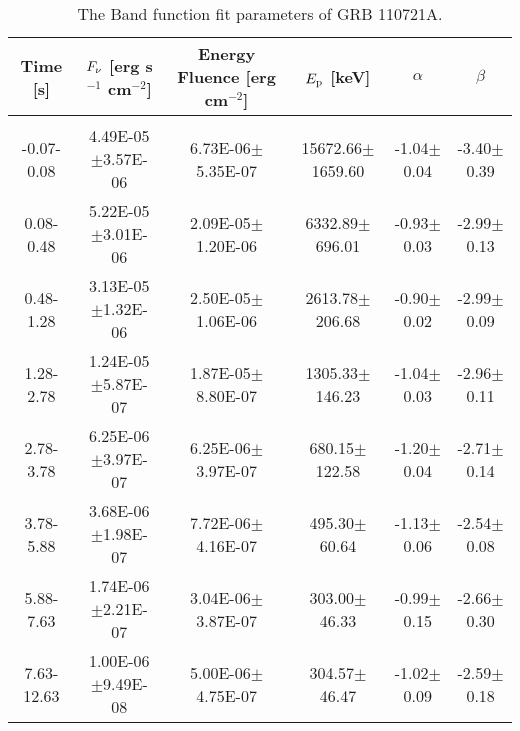 \begin{table}[h]
\centering
\scriptsize
\label{tab:}
\begin{tabular}{c| c c c c c}
Time [s] & $F_{\nu}$ [erg s$^{-1}$ cm$^{-2}$] & Energy Fluence [erg cm$^{-2}$] & $E_{\rm p}$ [keV] & $\alpha$ & $\beta$ \\
\hline \hline\\ 

-0.07-0.08 & 4.49E-05$\pm$3.57E-06 & 6.73E-06$\pm$5.35E-07 & 15672.66$\pm$1659.60 & -1.04$\pm$0.04 & -3.40$\pm$0.39 \\ 

0.08-0.48 & 5.22E-05$\pm$3.01E-06 & 2.09E-05$\pm$1.20E-06 & 6332.89$\pm$696.01 & -0.93$\pm$0.03 & -2.99$\pm$0.13 \\ 

0.48-1.28 & 3.13E-05$\pm$1.32E-06 & 2.50E-05$\pm$1.06E-06 & 2613.78$\pm$206.68 & -0.90$\pm$0.02 & -2.99$\pm$0.09 \\ 

1.28-2.78 & 1.24E-05$\pm$5.87E-07 & 1.87E-05$\pm$8.80E-07 & 1305.33$\pm$146.23 & -1.04$\pm$0.03 & -2.96$\pm$0.11 \\ 

2.78-3.78 & 6.25E-06$\pm$3.97E-07 & 6.25E-06$\pm$3.97E-07 & 680.15$\pm$122.58 & -1.20$\pm$0.04 & -2.71$\pm$0.14 \\ 

3.78-5.88 & 3.68E-06$\pm$1.98E-07 & 7.72E-06$\pm$4.16E-07 & 495.30$\pm$60.64 & -1.13$\pm$0.06 & -2.54$\pm$0.08 \\ 

5.88-7.63 & 1.74E-06$\pm$2.21E-07 & 3.04E-06$\pm$3.87E-07 & 303.00$\pm$46.33 & -0.99$\pm$0.15 & -2.66$\pm$0.30 \\ 

7.63-12.63 & 1.00E-06$\pm$9.49E-08 & 5.00E-06$\pm$4.75E-07 & 304.57$\pm$46.47 & -1.02$\pm$0.09 & -2.59$\pm$0.18 \\ 

\end{tabular}
\caption{The Band function fit parameters of GRB 110721A.}
\end{table}

